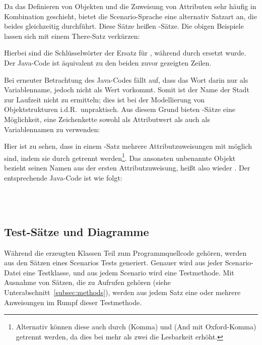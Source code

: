 Da das Definieren von Objekten und die Zuweisung von Attributen sehr häufig in Kombination geschieht, bietet die Scenario-Sprache eine alternativ Satzart an, die beides gleichzeitig durchführt.
Diese Sätze heißen -Sätze.
Die obigen Beispiele lassen sich mit einem There-Satz verkürzen:


Hierbei sind die Schlüsselwörter  der Ersatz für ,
während  durch  ersetzt wurde.
Der Java-Code ist äquivalent zu den beiden zuvor gezeigten Zeilen.

Bei erneuter Betrachtung des Java-Codes fällt auf, dass das Wort  darin nur als Variablenname, jedoch nicht als Wert vorkommt.
Somit ist der Name der Stadt zur Laufzeit nicht zu ermitteln;
dies ist bei der Modellierung von Objektstrukturen i.d.R.\ unpraktisch.
Aus diesem Grund bieten -Sätze eine Möglichkeit, eine Zeichenkette sowohl als Attributwert als auch als Variablennamen zu verwenden:


Hier ist zu sehen, dass in einem -Satz mehrere Attributzuweisungen mit  möglich sind, indem sie durch  getrennt werden\footnote{
Alternativ können diese auch durch \code{,} (Komma) und  (And mit Oxford-Komma) getrennt werden, da dies bei mehr als zwei  die Lesbarkeit erhöht.
}.
Das ansonsten unbenannte Objekt bezieht seinen Namen aus der ersten Attributzuweisung,
heißt also wieder .
Der entsprechende Java-Code ist wie folgt:

\\
\\

\subsection{Test-Sätze und Diagramme}\label{subsec:test-sentences-and-diagrams}

Während die erzeugten Klassen Teil zum Programmquellcode gehören,
werden aus den Sätzen eines Scenarios Tests generiert.
Genauer wird aus jeder Scenario-Datei eine Testklasse,
und aus jedem Scenario wird eine Testmethode.
Mit Ausnahme von Sätzen, die zu Aufrufen gehören (siehe Unterabschnitt~\ref{subsec:methods}),
werden aus jedem Satz eine oder mehrere Anweisungen im Rumpf dieser Testmethode.

